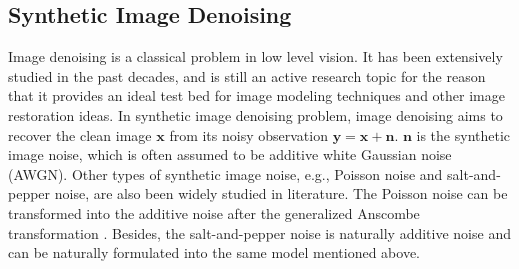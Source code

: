 \subsection{Synthetic Image Denoising}
\label{sec:review:sys}

Image denoising is a classical problem in low level vision. It has been extensively studied in the past decades, and is still an active research topic for the reason that it provides an ideal test bed for image modeling techniques and other image restoration ideas. In synthetic image denoising problem, image denoising aims to recover the clean image $\mathbf{x}$ from its noisy observation $\mathbf{y} = \mathbf{x} + \mathbf{n}$. $\mathbf{n}$ is the synthetic image noise, which is often assumed to be additive white Gaussian noise (AWGN). Other types of synthetic image noise, e.g., Poisson noise and salt-and-pepper noise, are also been widely studied in literature. The Poisson noise can be transformed into the additive noise after the generalized Anscombe transformation \cite{makitalo2013optimal}. Besides, the salt-and-pepper noise is naturally additive noise and can be naturally formulated into the same model mentioned above.


